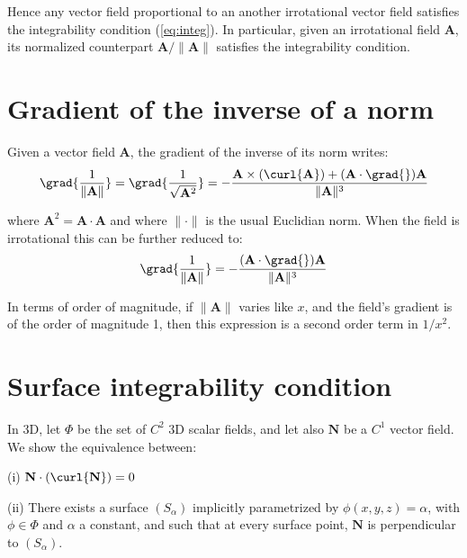 Hence any vector field proportional to an another irrotational vector field 
satisfies the integrability condition (\ref{eq:integ}). 
In particular, given an irrotational field $\mathbf{A}$, its normalized
counterpart
$ \mathbf{A} / \|\mathbf{A}\| $ satisfies the integrability condition.

\section*{Gradient of the inverse of a norm}
Given a vector field $\mathbf{A}$, the gradient of the inverse of its norm writes:
\[ 
  \grad{\frac{1}{\|\mathbf{A}\|}} = 
  \grad{\frac{1}{\sqrt{\mathbf{A}^2}}} =
  - \frac{\mathbf{A} \times (\curl{\mathbf{A}}) + 
  (\mathbf{A}\cdot\grad{})\mathbf{A}}{\|\mathbf{A}\|^3} 
  \]


 
where $\mathbf{A}^2= \mathbf{A} \cdot \mathbf{A}$ and where $ \| \cdot \| $ is 
the usual Euclidian norm.
When the field is irrotational this can be further reduced to:
\[
  \grad{\frac{1}{\|\mathbf{A}\|}} = 
  - \frac{(\mathbf{A}\cdot\grad{})\mathbf{A}}{\|\mathbf{A}\|^3} 
  \]

In terms of order of magnitude, if $ \|\mathbf{A}\| $ varies like $x$, and 
the field's gradient is of the order of magnitude 1, then
this expression is a second order term in $1/x^2$.

\section*{Surface integrability condition}
In 3D, let $\Phi$ be the set of $C^2$ 3D scalar fields, and let also $\mathbf{N}$ be a 
$C^1$  vector field.
We show the equivalence between:

(i)  $ \mathbf{N} \cdot (\curl{\mathbf{N}}) = 0 $ 

(ii) There exists a surface $(S_\alpha)$ implicitly parametrized
 by $\phi(x,y,z) = \alpha$,
with $\phi \in \Phi$ and $\alpha$ a constant, 
and such that at every surface point, $\mathbf{N}$ 
is perpendicular to $(S_\alpha)$. 

